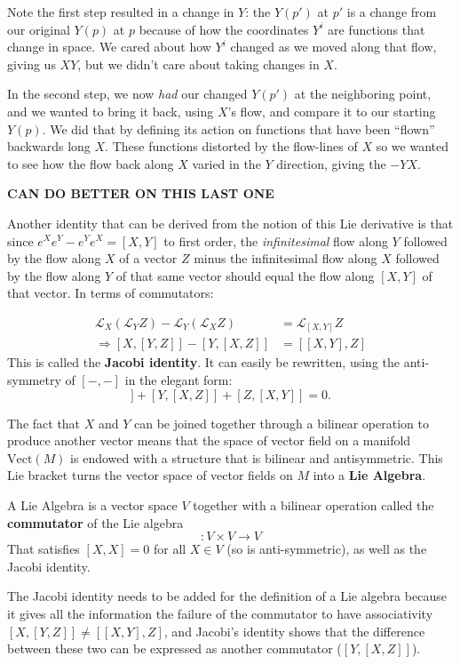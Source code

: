 \documentclass[../master.tex]{subfiles}
\begin{document}
		Note the first step resulted in a change in $Y$: the $Y(p')$ at $p'$ is a change from our original $Y(p)$ at $p$ because of how the coordinates $Y^i$ are functions that change in space. We cared about how $Y^i$ changed as we moved along that flow, giving us $XY$, but we didn't care about taking changes in $X$. 
		
		In the second step, we now \emph{had} our changed $Y(p')$ at the neighboring point, and we wanted to bring it back, using $X$'s flow, and compare it to our starting $Y(p)$. We did that by defining its action on functions that have been ``flown'' backwards long $X$. These functions distorted by the flow-lines of $X$ so we wanted to see how the flow back along $X$ varied in the $Y$ direction, giving the $-YX$. 
		
		\textbf{CAN DO BETTER ON THIS LAST ONE}
		
		Another identity that can be derived from the notion of this Lie derivative is that since $e^{X} e^{Y} - e^{Y} e^{X} = [X,Y]$ to first order, the \emph{infinitesimal} flow along $Y$ followed by the flow along $X$ of a vector $Z$ minus the infinitesimal flow along $X$ followed by the flow along $Y$ of that same vector should equal the flow along $[X,Y]$ of that vector. In terms of commutators:
		
		\begin{align}
			\mathcal L_X (\mathcal L_Y Z) - \mathcal L_Y (\mathcal L_X Z) &= \mathcal L_{[X,Y]} Z 
			\\ \Rightarrow [X,[Y,Z]] - [Y,[X,Z]] &= [[X,Y],Z]
		\end{align}
		This is called the \textbf{Jacobi identity}. It can easily be rewritten, using the anti-symmetry of $[-,-]$ in the elegant form:
		\begin{equation*}
			[X, [Y,Z]] + [Y, [X,Z]] + [Z, [X,Y]] = 0.
		\end{equation*}
		
		The fact that $X$ and $Y$ can be joined together through a bilinear operation to produce another vector means that the space of vector field on a manifold $\text{Vect}(M)$ is endowed with a structure that is bilinear and antisymmetric. This Lie bracket turns the vector space of vector fields on $M$ into a \textbf{Lie Algebra}.
		\begin{defn}
			A Lie Algebra is a vector space $V$ together with a bilinear operation called the \textbf{commutator} of the Lie algebra
			\begin{equation*}
				[-,-]: V \times V \rightarrow V
			\end{equation*}
			That satisfies $[X, X] = 0$ for all $X \in V$ (so is anti-symmetric), as well as the Jacobi identity. 
		\end{defn} 
		The Jacobi identity needs to be added for the definition of a Lie algebra because it gives all the information the failure of the commutator to have associativity $[X,[Y,Z]] \neq [[X,Y],Z]$, and Jacobi's identity shows that the difference between these two can be expressed as another commutator ($[Y,[X,Z]]$).
		
\end{document}
